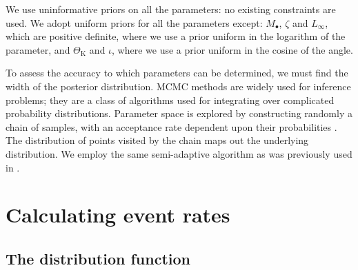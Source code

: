 \documentclass[useAMS,usedcolumn,usegraphicx,usenatbib]{mn2e}
\newcommand{\sub}[1]{\ensuremath{_\mathrm{#1}}}
\begin{document}
We use uninformative priors on all the parameters: no existing constraints are used. We adopt uniform priors for all the parameters except: $M_\bullet$, $\zeta$ and $L_\infty$, which are positive definite, where we use a prior uniform in the logarithm of the parameter, and $\Theta\sub{K}$ and $\iota$, where we use a prior uniform in the cosine of the angle.

To assess the accuracy to which parameters can be determined, we must find the width of the posterior distribution. MCMC methods are widely used for inference problems; they are a class of algorithms used for integrating over complicated probability distributions. Parameter space is explored by constructing randomly a chain of samples, with an acceptance rate dependent upon their probabilities \citep{Metropolis1953,Hastings1970}. The distribution of points visited by the chain maps out the underlying distribution. We employ the same semi-adaptive algorithm as was previously used in \citet{Berry2013}.

\section{Calculating event rates}\label{sec:Rates}

\subsection{The distribution function}
\end{document}
